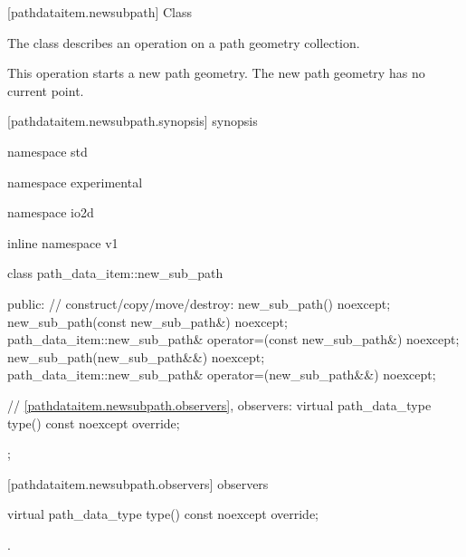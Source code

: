  [pathdataitem.newsubpath] {Class }

\pnum
{}
The class  describes an operation on a path geometry collection.

\pnum
This operation starts a new path geometry. The new path geometry has no current point.

 [pathdataitem.newsubpath.synopsis] { synopsis}

\begin{codeblock}
namespace std { namespace experimental { namespace io2d { inline namespace v1 {
  class path_data_item::new_sub_path {
  public:
    // construct/copy/move/destroy:
    new_sub_path() noexcept;
    new_sub_path(const new_sub_path&) noexcept;
    path_data_item::new_sub_path& operator=(const new_sub_path&) noexcept;
    new_sub_path(new_sub_path&&) noexcept;
    path_data_item::new_sub_path& operator=(new_sub_path&&) noexcept;

    // \ref{pathdataitem.newsubpath.observers}, observers:
    virtual path_data_type type() const noexcept override;
  };
} } } }
\end{codeblock}

 [pathdataitem.newsubpath.observers]{ observers}

\begin{itemdecl}
    virtual path_data_type type() const noexcept override;
\end{itemdecl}
\begin{itemdescr}
	\pnum
	\returns
	.

\end{itemdescr}

